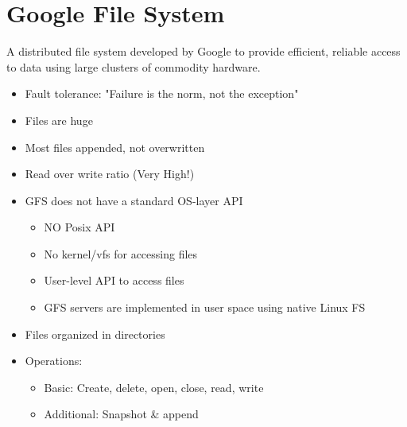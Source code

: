 \section{Google File System}
A distributed file system developed by Google to provide efficient, reliable access to data using large clusters of commodity hardware.
\begin{itemize}
  \item Fault tolerance: "Failure is the norm, not the exception"
  \item Files are huge
  \item Most files appended, not overwritten
  \item Read over write ratio (Very High!)
\end{itemize}
\begin{itemize}
  \item GFS does not have a standard OS-layer API
  \begin{itemize}
    \item NO Posix API
    \item No kernel/vfs for accessing files
    \item User-level API to access files
    \item GFS servers are implemented in user space using native Linux FS
  \end{itemize}
  \item Files organized in directories
  \item Operations:
  \begin{itemize}
    \item Basic: Create, delete, open, close, read, write
    \item Additional: Snapshot \& append
  \end{itemize}
\end{itemize}

